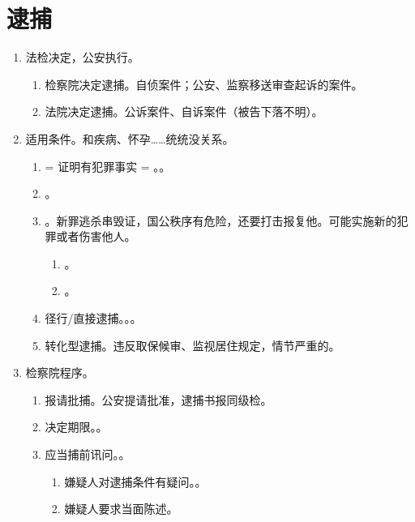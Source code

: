 \section{逮捕}
\begin{enumerate}
  \item 法检决定，公安执行。
        \begin{enumerate}
          \item 检察院决定逮捕。自侦案件；公安、监察移送审查起诉的案件。
          \item 法院决定逮捕。公诉案件、自诉案件（被告下落不明）。
        \end{enumerate}
  \item 适用条件。和疾病、怀孕……统统没关系。
        \begin{enumerate}
          \item {} = 证明有犯罪事实 = 。。
          \item {}。
          \item {}。新罪逃杀串毁证，国公秩序有危险，还要打击报复他。可能实施新的犯罪或者伤害他人。
                \begin{enumerate}
                  \item {}。
                  \item {}。
                \end{enumerate}
          \item 径行/直接逮捕。。。
          \item 转化型逮捕。违反取保候审、监视居住规定，情节严重的。
        \end{enumerate}
  \item 检察院程序。
        \begin{enumerate}
          \item 报请批捕。公安提请批准，逮捕书报同级检。
          \item 决定期限。。
          \item 应当捕前讯问。。
                \begin{enumerate}
                  \item 嫌疑人对逮捕条件有疑问。。
                  \item 嫌疑人要求当面陈述。

\end{enumerate}
\end{enumerate}
\end{enumerate}
